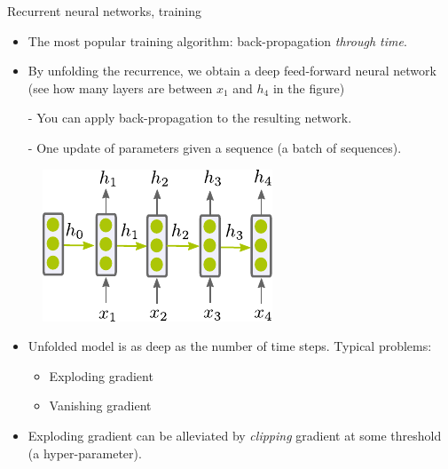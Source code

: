 \begin{frame}{Recurrent neural networks, training}
\begin{itemize}
\item The most popular training algorithm: back-propagation \textit{through time}.
\item By unfolding the recurrence, we obtain a deep feed-forward neural network (see how many layers
are between $x_1$ and $h_4$ in the figure)
\item[-] You can apply back-propagation to the resulting network.
\item[-] One update of parameters given a sequence (a batch of sequences).
\end{itemize}
\begin{figure}
\centering
\includegraphics[width=.3\linewidth]{./figures/rnn.pdf}
\end{figure}
\vsp
\begin{itemize}
\item Unfolded model is as deep as the number of time steps. Typical problems:
\begin{itemize}
\item Exploding gradient
\item Vanishing gradient
\end{itemize}
\item Exploding gradient can be alleviated by \textit{clipping} gradient at some threshold (a hyper-parameter).
\end{itemize}

\end{frame}

